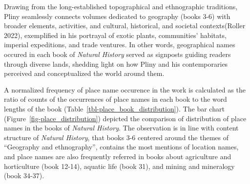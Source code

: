 \documentclass[
  12pt,
]{article}
\begin{document}
Drawing from the long-established topographical and ethnographic
traditions, Pliny seamlessly connects volumes dedicated to geography
(books 3-6) with broader elements, activities, and cultural, historical,
and societal contexts(Roller 2022), exemplified in his portrayal of
exotic plants, communities' habitats, imperial expeditions, and trade
ventures. In other words, geographical names occured in each book of
\emph{Natural History} served as signposts guiding readers through
diverse lands, shedding light on how Pliny and his contemporaries
perceived and conceptualized the world around them.

A normalized frequency of place name occurence in the work is calculated
as the ratio of counts of the occurrences of place names in each book to
the word lengths of the book (Table~\ref{tbl-place_book_distribution}).
The bar chart (Figure~\ref{fig-place_distribution}) depicted the
comparison of distribution of place names in the books of \emph{Natural
History}. The observation is in line with content structure of
\emph{Natural History}, that books 3-6 centered around the themes of
``Geography and ethnography'', contains the most mentions of location
names, and place names are also frequently referred in books about
agriculture and horticulture (book 12-14), aquatic life (book 31), and
mining and mineralogy (book 34-37).
\end{document}

